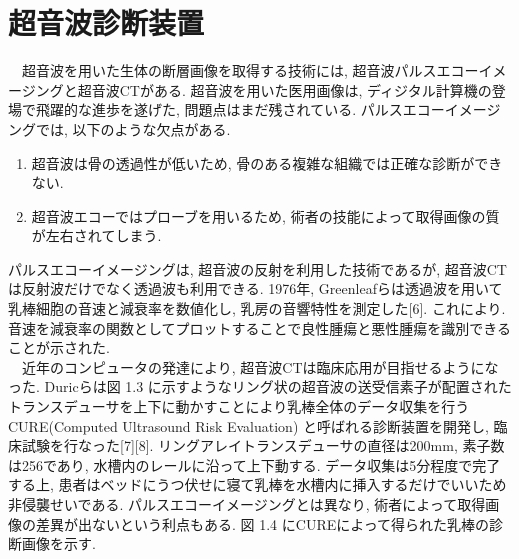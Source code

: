 \section{超音波診断装置}
　超音波を用いた生体の断層画像を取得する技術には, 超音波パルスエコーイメージングと超音波CTがある. 超音波を用いた医用画像は, ディジタル計算機の登場で飛躍的な進歩を遂げた, 問題点はまだ残されている. パルスエコーイメージングでは, 以下のような欠点がある. 
\begin{enumerate}
   \item 超音波は骨の透過性が低いため, 骨のある複雑な組織では正確な診断ができない.
   \item 超音波エコーではプローブを用いるため, 術者の技能によって取得画像の質が左右されてしまう.
\end{enumerate}
パルスエコーイメージングは, 超音波の反射を利用した技術であるが, 超音波CTは反射波だけでなく透過波も利用できる. 1976年, Greenleafらは透過波を用いて乳棒細胞の音速と減衰率を数値化し, 乳房の音響特性を測定した[6]. これにより. 音速を減衰率の関数としてプロットすることで良性腫瘍と悪性腫瘍を識別できることが示された.
\\\ \ 近年のコンピュータの発達により, 超音波CTは臨床応用が目指せるようになった. Duricらは図 1.3 に示すようなリング状の超音波の送受信素子が配置されたトランスデューサを上下に動かすことにより乳棒全体のデータ収集を行うCURE(Computed Ultrasound Risk Evaluation) と呼ばれる診断装置を開発し, 臨床試験を行なった[7][8]. リングアレイトランスデューサの直径は200mm, 素子数は256であり, 水槽内のレールに沿って上下動する. データ収集は5分程度で完了する上, 患者はベッドにうつ伏せに寝て乳棒を水槽内に挿入するだけでいいため非侵襲せいである. パルスエコーイメージングとは異なり, 術者によって取得画像の差異が出ないという利点もある. 図 1.4 にCUREによって得られた乳棒の診断画像を示す.

